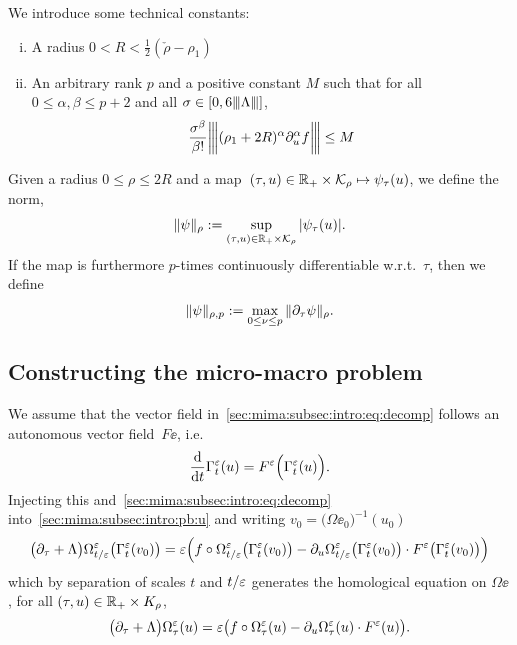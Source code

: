 \begin{definition} \label{sec:mima:subsec:def:def:RM}
  We introduce some technical constants:
  \begin{enumerate}[(i)]
    \item A radius $0 < R < \frac{1}{2} ( \check{\rho} - \rho_1 )$ 
    \item An arbitrary rank $p$ and a positive constant $M$ 
          such that for all $0 \leq \alpha, \beta \leq p + 2$ and all
          $\sigma \in \left[0, 6 {\left\vert\kern-0.25ex\left\vert\kern-0.25ex\left\vert \Lambda \right\vert\kern-0.25ex\right\vert\kern-0.25ex\right\vert} \right]$, 
          \[  \frac{\sigma^{\beta}}{\beta!} 
              {\left\vert\kern-0.25ex\left\vert\kern-0.25ex\left\vert  \vphantom{\frac11} (\rho_1 + 2R)^{\alpha}\partial_{u}^{\alpha} f  \right\vert\kern-0.25ex\right\vert\kern-0.25ex\right\vert} 
              \leq M
          \]
  \end{enumerate}
\end{definition}
Given a radius $0 \leq \rho \leq 2R$ and a map~$(\tau,u) \in \mathbb{R}_+ \times 
\mathcal{K}_{\rho} \mapsto \psi_{\tau}(u)$, we define the norm, 
\begin{equation} \label{sec:mima:subsec:def:def:norm}
  \| \psi \|_{\rho} := \sup_{(\tau, u) \in \mathbb{R}_+ \times \mathcal{K}_{\rho}} 
                      | \psi_{\tau}(u) | . 
\end{equation}
If the map is furthermore $p$-times continuously differentiable 
w.r.t.~$\tau$, then we define
\begin{equation} \label{sec:mima:subsec:def:def:norm_p}
  \| \psi \|_{\rho, p} := \max_{0 \leq \nu \leq p} \| \partial_{\tau} \psi \|_{\rho} .
\end{equation}






\subsection{Constructing the micro-macro problem} 
\label{sec:mima:subsec:maps}

We assume that the vector field in~\eqref{sec:mima:subsec:intro:eq:decomp} follows an autonomous vector field~$F\ee$, i.e. 
\begin{equation}
    \frac{\mathrm{d}}{\mathrm{d} t} \Gamma^{\varepsilon}_t (u) = F^{\varepsilon} \Big( \Gamma^{\varepsilon}_t (u) \Big) .
\end{equation}
Injecting this and~\eqref{sec:mima:subsec:intro:eq:decomp} into~\eqref{sec:mima:subsec:intro:pb:u} and writing $v_0 = \big( \Omega\ee_0 \big)^{-1} (u_0)$
\begin{equation*}
    \big( \partial_{\tau} + \Lambda \big) \Omega^{\varepsilon}_{t/\varepsilon} \big( \Gamma^{\varepsilon}_t (v_0) \big) 
    = \varepsilon \Big( f \circ \Omega^{\varepsilon}_{t/\varepsilon} \big( \Gamma^{\varepsilon}_t (v_0) \big)
    - \partial_{u} \Omega^{\varepsilon}_{t/\varepsilon}\big( \Gamma^{\varepsilon}_t (v_0) \big) \cdot F^{\varepsilon} \big( \Gamma^{\varepsilon}_t (v_0) \big) \Big)
\end{equation*}
which by separation of scales $t$ and $t/\varepsilon$ generates the homological 
equation on $\Omega\ee$, for all $(\tau, u) \in \mathbb{R}_+ \times K_{\rho}$, 
\begin{equation} \label{sec:mima:subsec:maps:eq:exact_homol}
    \big( \partial_{\tau} + \Lambda \big) \Omega^{\varepsilon}_{\tau} (u) = \varepsilon \big( f \circ \Omega^{\varepsilon}_{\tau}(u)  - \partial_{u} \Omega^{\varepsilon}_{\tau}(u) \cdot F^{\varepsilon}(u) \big) . 
\end{equation}

